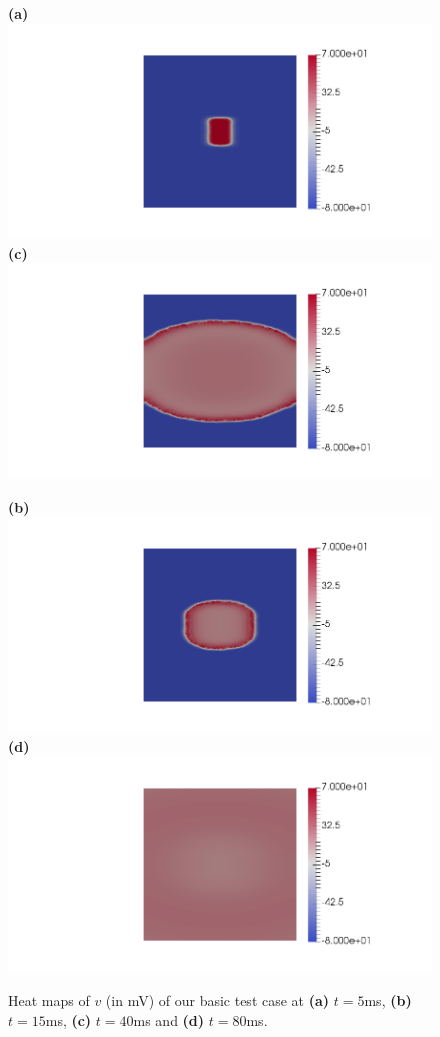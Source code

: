 \documentclass[12pt,a4paper]{article}
\begin{document}
%
\begin{figure}
\begin{minipage}{0.47\textwidth}
 \textbf{(a)} \includegraphics[trim=9cm 0cm 2cm 0cm, clip=true, width=0.9\linewidth]{v5}
      \textbf{(c)} \includegraphics[trim=9cm 0cm 2cm 0cm, clip=true, width=0.9\linewidth]{v40}
    \end{minipage}
    \begin{minipage}{0.47\textwidth}
  \textbf{(b)} \includegraphics[trim=9cm 0cm 2cm 0cm, clip=true, width=0.9\linewidth]{v15}
  \textbf{(d)} \includegraphics[trim=9cm 0cm 2cm 0cm, clip=true, width=0.9\linewidth]{v90}
    \end{minipage}
    \caption{Heat maps of $v$ (in mV) of our basic test case at \textbf{(a)} $t=5$ms, \textbf{(b)} $t=15$ms, \textbf{(c)} $t=40$ms and \textbf{(d)} $t=80$ms.}
    \label{fig:1}
\end{figure}
\end{document}

